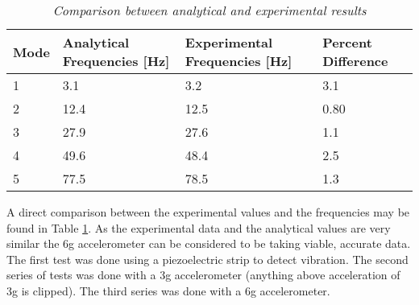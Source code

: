 \begin{table}
\begin{center}
    \begin{tabular}{|l|l|l|l|}
    \hline
    Mode & Analytical Frequencies [Hz] & Experimental Frequencies [Hz] & Percent Difference \\
    \hline
    1    & 3.1                         & 3.2                           & 3.1                \\
    2    & 12.4                        & 12.5                          & 0.80               \\
    3    & 27.9                        & 27.6                          & 1.1                \\
    4    & 49.6                        & 48.4                          & 2.5                \\
    5    & 77.5                        & 78.5                          & 1.3                \\
    \hline
    \end{tabular}
    \caption{\textit{Comparison between analytical and experimental results}}
    \label{tab:ExperimentalvsAnalytical}
\end{center}
\end{table}
A direct comparison between the experimental values and the frequencies may be found in Table \ref{tab:ExperimentalvsAnalytical}.
As the experimental data and the analytical values are very similar the 6g accelerometer can be considered to be taking viable, accurate data.
The first test was done using a piezoelectric strip to detect vibration. The second series of tests was done with a 3g accelerometer (anything above acceleration of 3g is clipped). The third series was done with a 6g accelerometer.
